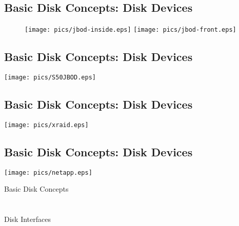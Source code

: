 \documentclass[xga]{xdvislides}
\begin{document}
\subsection{Basic Disk Concepts: Disk Devices}
\begin{figure}[hb]
	\begin{center}
		\texttt{[image: pics/jbod-inside.eps]}
		\hspace*{15mm}
		\texttt{[image: pics/jbod-front.eps]} \\
	\end{center}
\end{figure}


\subsection{Basic Disk Concepts: Disk Devices}
\vfill
	\begin{center}
		\texttt{[image: pics/S50JBOD.eps]} \\
	\end{center}
\vfill

\subsection{Basic Disk Concepts: Disk Devices}
	\begin{center}
		\texttt{[image: pics/xraid.eps]} \\
	\end{center}


\subsection{Basic Disk Concepts: Disk Devices}
	\begin{center}
		\texttt{[image: pics/netapp.eps]} \\
	\end{center}

\newpage
\vspace*{\fill}
\begin{center}
	\Hugesize
		Basic Disk Concepts \\ [1em]
	\hspace*{5mm}
	\blueline\\
	\hspace*{5mm}\\
		Disk Interfaces
\end{center}
\vspace*{\fill}
\end{document}
